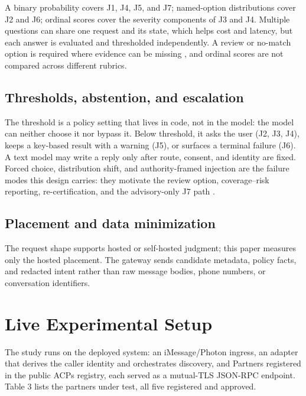 \documentclass[runningheads,a4paper]{llncs}
\begin{document}
A binary probability covers J1, J4, J5, and J7; named-option distributions cover J2 and J6; ordinal scores cover the severity components of J3 and J4. Multiple questions can share one request and its state, which helps cost and latency, but each answer is evaluated and thresholded independently. A review or no-match option is required where evidence can be missing \cite{geifman2017selective}, and ordinal scores are not compared across different rubrics.

\subsection{Thresholds, abstention, and escalation}

The threshold is a policy setting that lives in code, not in the model: the model can neither choose it nor bypass it. Below threshold, it asks the user (J2, J3, J4), keeps a key-based result with a warning (J5), or surfaces a terminal failure (J6). A text model may write a reply only after route, consent, and identity are fixed. Forced choice, distribution shift, and authority-framed injection are the failure modes this design carries: they motivate the review option, coverage--risk reporting, re-certification, and the advisory-only J7 path \cite{geifman2017selective,greshake2023indirect}.

\subsection{Placement and data minimization}

The request shape supports hosted or self-hosted judgment; this paper measures only the hosted placement. The gateway sends candidate metadata, policy facts, and redacted intent rather than raw message bodies, phone numbers, or conversation identifiers.

\section{Live Experimental Setup}

The study runs on the deployed system: an iMessage/Photon ingress, an adapter that derives the caller identity and orchestrates discovery, and Partners registered in the public ACPs registry, each served as a mutual-TLS JSON-RPC endpoint. Table 3 lists the partners under test, all five registered and approved.
\end{document}
